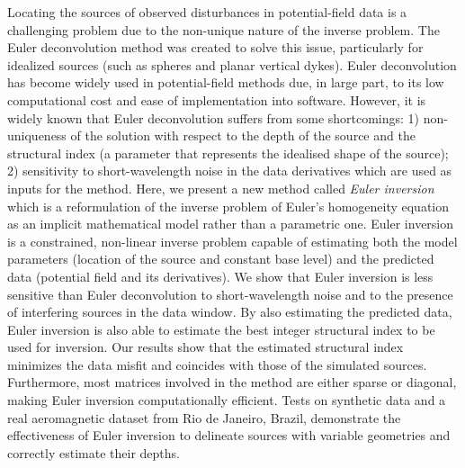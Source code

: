 Locating the sources of observed disturbances in potential-field data is a challenging problem due to the non-unique nature of the inverse problem.
The Euler deconvolution method was created to solve this issue, particularly for idealized sources (such as spheres and planar vertical dykes).
Euler deconvolution has become widely used in potential-field methods due, in large part, to its low computational cost and ease of implementation into software.
However, it is widely known that Euler deconvolution suffers from some shortcomings: 1) non-uniqueness of the solution with respect to the depth of the source and the structural index (a parameter that represents the idealised shape of the source); 2) sensitivity to short-wavelength noise in the data derivatives which are used as inputs for the method.
Here, we present a new method called \textit{Euler inversion} which is a reformulation of the inverse problem of Euler's homogeneity equation as an implicit mathematical model rather than a parametric one.
Euler inversion is a constrained, non-linear inverse problem capable of estimating both the model parameters (location of the source and constant base level) and the predicted data (potential field and its derivatives).
We show that Euler inversion is less sensitive than Euler deconvolution to short-wavelength noise and to the presence of interfering sources in the data window.
By also estimating the predicted data, Euler inversion is also able to estimate the best integer structural index
to be used for inversion.
Our results show that the estimated structural index minimizes the data misfit and coincides with those of the simulated sources.
Furthermore, most matrices involved in the method are either sparse or diagonal, making Euler inversion computationally efficient.
Tests on synthetic data and a real aeromagnetic dataset from Rio de Janeiro, Brazil, demonstrate the effectiveness of Euler inversion to delineate sources with variable geometries and correctly estimate their depths.
